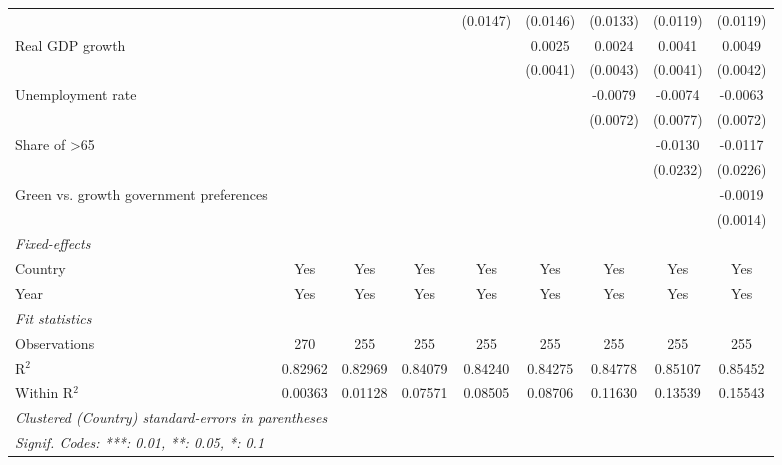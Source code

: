 \begin{table}[htbp]
\begin{tabular}{lcccccccc}
                                              &          &          &          & (0.0147) & (0.0146)     & (0.0133) & (0.0119)     & (0.0119)\\   
      Real GDP growth                         &          &          &          &          & 0.0025       & 0.0024   & 0.0041       & 0.0049\\   
                                              &          &          &          &          & (0.0041)     & (0.0043) & (0.0041)     & (0.0042)\\   
      Unemployment rate                       &          &          &          &          &              & -0.0079  & -0.0074      & -0.0063\\   
                                              &          &          &          &          &              & (0.0072) & (0.0077)     & (0.0072)\\   
      Share of >65                            &          &          &          &          &              &          & -0.0130      & -0.0117\\   
                                              &          &          &          &          &              &          & (0.0232)     & (0.0226)\\   
      Green vs. growth government preferences &          &          &          &          &              &          &              & -0.0019\\   
                                              &          &          &          &          &              &          &              & (0.0014)\\   
      \midrule
      \emph{Fixed-effects}\\
      Country                                 & Yes      & Yes      & Yes      & Yes      & Yes          & Yes      & Yes          & Yes\\  
      Year                                    & Yes      & Yes      & Yes      & Yes      & Yes          & Yes      & Yes          & Yes\\  
      \midrule
      \emph{Fit statistics}\\
      Observations                            & 270      & 255      & 255      & 255      & 255          & 255      & 255          & 255\\  
      R$^2$                                   & 0.82962  & 0.82969  & 0.84079  & 0.84240  & 0.84275      & 0.84778  & 0.85107      & 0.85452\\  
      Within R$^2$                            & 0.00363  & 0.01128  & 0.07571  & 0.08505  & 0.08706      & 0.11630  & 0.13539      & 0.15543\\  
      \midrule \midrule
      \multicolumn{9}{l}{\emph{Clustered (Country) standard-errors in parentheses}}\\
      \multicolumn{9}{l}{\emph{Signif. Codes: ***: 0.01, **: 0.05, *: 0.1}}\\
   \end{tabular}
\end{table}


